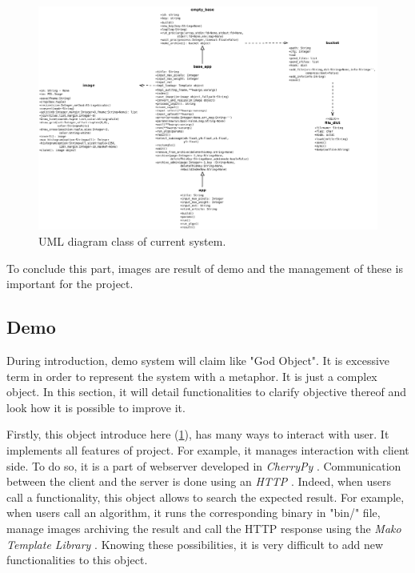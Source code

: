 \begin{figure}[H]
  \centering
  \includegraphics[width=20.0cm, angle=90]{blobs/images/IPOL_diagram_class.pdf}
  \caption{UML diagram class of current system. }
  \label{img:IPOL_diagram_class}
\end{figure}

To conclude this part, images are result of demo and the management of these is important
for the project.

\subsection{Demo}
During introduction, demo system will claim like "God Object". It is excessive term in
order to represent the system with a metaphor. It is just a complex object.
In this section, it will detail functionalities to clarify objective thereof and
look how it is possible to improve it.\\
\setlength{\parindent}{0cm}

Firstly, this object introduce here (\ref{img:IPOL_diagram_class}), has many ways to
interact with user. It implements all features of project. For example, it manages
interaction with client side. To do so, it is a part of webserver developed in
\emph{CherryPy} \cite{CherryPy}.
Communication between the client and the server is done using an
\emph{HTTP} \cite{HTTP}. Indeed, when users call a functionality,
this object allows to search the expected result. For example, when users call an algorithm,
it runs the corresponding binary in "bin/" file, manage images archiving the result
and call the HTTP response using the \emph{Mako Template Library} \cite{Mako}.
Knowing these possibilities, it is very difficult to add new functionalities to this object.
\\
\setlength{\parindent}{0cm}

